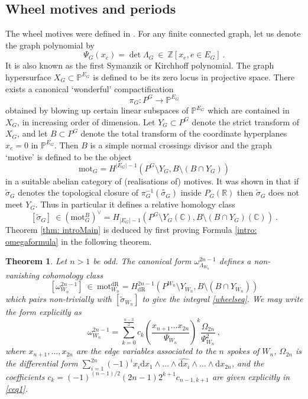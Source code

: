 \documentclass[10pt]{amsart}
\newcommand{\CC}{{\mathbb C}}
\newcommand{\PP}{{\mathbb P}}
\newcommand{\RR}{{\mathbb R}}
\newcommand{\ZZ}{{\mathbb Z}}
\newcommand{\dd}{\mathrm{d}}
\theoremstyle{plain}
\newtheorem{thm}{Theorem}
\newcommand{\To}{\longrightarrow}
\newcommand{\0}{\color{blue}{\mathsf{0}}}
\begin{document}
\subsection{Wheel motives and periods}
The wheel motives were defined in \cite{BEK}. For any finite connected graph, let  us denote the graph polynomial by 
\begin{equation}  \label{intro: psiGdef}\Psi_{G} (x_e) = \det \Lambda_{G} \  \in \  \ZZ [x_e, e\in E_G] \ .  \end{equation}
It is also known as the first Symanzik or Kirchhoff polynomial. The graph hypersurface $X_G \subset \PP^{E_G}$ is defined to be its zero locus in projective space. There exists a canonical `wonderful' compactification 
\[ \pi_G: P^G \To \PP^{E_G}\]
obtained by blowing up  certain linear subspaces of $\PP^{E_G}$ which  are contained in $X_G$, in increasing order of dimension. Let $Y_G \subset P^G$ denote the strict transform of $X_G$, and let $B \subset P^G$ denote the total transform of the coordinate hyperplanes $x_e=0$ in $\PP^{E_G}$. Then $B$ is a simple normal crossings divisor and the graph `motive' is defined to be the object 
\[ \mathrm{mot}_G = H^{|E_G|-1} \left(P^G \setminus Y_G , B \setminus (B \cap Y_G)  \right)   \]
in a suitable abelian category of (realisations of) motives.  It was shown in \cite{BEK} that if $\widetilde{\sigma}_G$ denotes the topological closure of $\pi_G^{-1}(\overset{\circ}{\sigma}_G)$ inside $P_G(\RR)$ then $\widetilde{\sigma}_G$ does not meet $Y_G.$ Thus in particular it defines
a relative homology class 
\[ [\widetilde{\sigma}_G] \  \in  (\mathrm{mot}_G^B)^{\vee}=  H_{|E_G|-1} \left(P^G \setminus  Y_G(\CC) , B \setminus  (B \cap Y_G)  (\CC) \right) \  . \]
Theorem  \ref{thm: introMain} is deduced by first proving Formula \eqref{intro: omegaformula} in the following theorem. 
\begin{thm} Let $n>1$ be odd.  The canonical form $\omega^{2n-1}_{\Lambda_{W_n}}$ defines a non-vanishing cohomology class
\[  [\omega^{2n-1}_{W_n} ]  \ \in \    \mathrm{mot}_{W_n}^ {\mathrm{dR}} =H_ {\mathrm{dR}}^{2n-1} \left(P^{W_n} \setminus Y_{W_n} , B \setminus (B \cap Y_{W_n})  \right)  \]
which pairs non-trivially with $[\widetilde{\sigma}_{W_n}]$ to give the integral \eqref{wheelseq}. We may write the form explicitly as
\begin{equation} \label{intro: omegaformula} \omega^{2n-1}_{W_n} =  \sum^{\frac{n-3}{2}}_{k=0}   c_k    \left(\frac{x_{n+1}\ldots x_{2n}}{\Psi_{W_n}}\right)^k \frac{\Omega_{2n}}{\Psi^2_{W_n}}\ ,
\end{equation}
where $x_{n+1},\ldots, x_{2n}$ are the edge variables associated to the $n$ spokes of $W_n$, $\Omega_{2n}$ is the  differential form  $ \sum_{i=1}^{2n} (-1)^i x_i \dd x_1 \wedge \ldots \wedge  \widehat{\dd x_i} \wedge \ldots \wedge \dd x_{2n}$, and the coefficients  $c_k=(-1)^{(n-1)/2}(2n-1)2^{k+1}c_{n-1,k+1}$ are given explicitly in \eqref{ceq1}.
\end{thm} 
\end{document}
